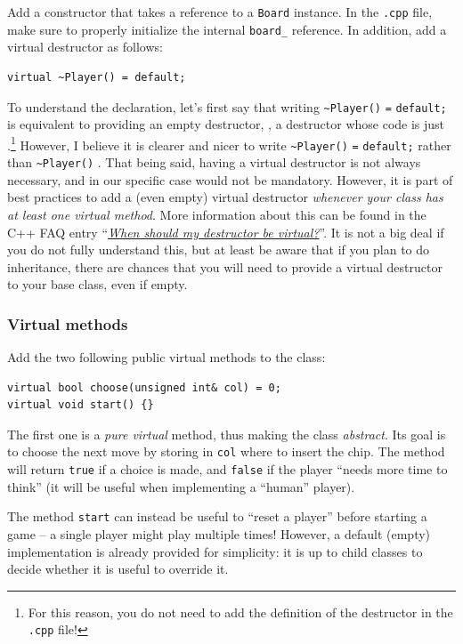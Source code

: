 \documentclass{article}
\begin{document}
Add a constructor that takes a reference to a \texttt{Board} instance. In the \texttt{.cpp} file, make sure to properly initialize the internal \texttt{board\string_} reference. In addition, add a virtual destructor as follows:
\begin{lstlisting}[style=mycpp,numbers=none]
virtual ~Player() = default;
\end{lstlisting}
To understand the declaration, let's first say that writing \texttt{\textasciitilde Player()} \texttt{=} \texttt{default;} is equivalent to providing an empty destructor, \ie, a destructor whose code is just \texttt{\string{\string}}.\footnote{For this reason, you do not need to add the definition of the destructor in the \texttt{.cpp} file!} However, I believe it is clearer and nicer to write \texttt{\textasciitilde Player()} \texttt{=} \texttt{default;} rather than \texttt{\textasciitilde Player()} \texttt{\string{\string}}. That being said, having a virtual destructor is not always necessary, and in our specific case would not be mandatory. However, it is part of best practices to add a (even empty) virtual destructor \emph{whenever your class has at least one virtual method}. More information about this can be found in the C++ FAQ entry ``\href{https://isocpp.org/wiki/faq/virtual-functions#virtual-dtors}{\emph{When should my destructor be virtual?}}''. It is not a big deal if you do not fully understand this, but at least be aware that if you plan to do inheritance, there are chances that you will need to provide a virtual destructor to your base class, even if empty.


\subsubsection{Virtual methods}

Add the two following public virtual methods to the class:
\begin{lstlisting}[style=mycpp,numbers=none]
virtual bool choose(unsigned int& col) = 0;
virtual void start() {}
\end{lstlisting}
The first one is a \emph{pure virtual} method, thus making the class \emph{abstract}. Its goal is to choose the next move by storing in \texttt{col} where to insert the chip. The method will return \texttt{true} if a choice is made, and \texttt{false} if the player ``needs more time to think'' (it will be useful when implementing a ``human'' player).

The method \texttt{start} can instead be useful to ``reset a player'' before starting a game -- a single player might play multiple times! However, a default (empty) implementation is already provided for simplicity: it is up to child classes to decide whether it is useful to override it.
\end{document}
